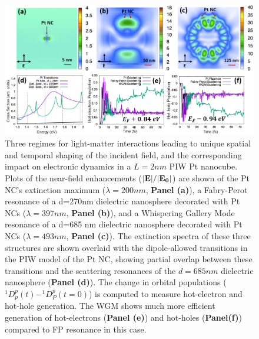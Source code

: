 \documentclass[journal=jpclcd,manuscript=article]{achemso}
\begin{document}
\begin{figure}
\begin{center}
\includegraphics[width=6in]{Pt_AllThree_Revision.png}
\caption{Three regimes for light-matter interactions leading to unique
spatial and temporal shaping of the incident field, and the corresponding
impact on electronic dynamics in a $L=2nm$ PIW Pt nanocube. Plots of the near-field enhancements (${\bf |E|}/{\bf |E_0|}$) are shown of the
Pt NC's extinction maximum ($\lambda=200 nm$, {\bf Panel (a)}), a Fabry-Perot resonance of a d=270nm dielectric nanosphere decorated with Pt NCs
($\lambda = 397 nm$, {\bf Panel (b)}),
and a Whispering Gallery Mode resonance of a d=685 nm dielectric nanosphere decorated with Pt NCs ($\lambda = 493 nm$, {\bf Panel (c)}).
The extinction spectra of these three structures are shown overlaid with the dipole-allowed transitions in the PIW model of the Pt NC, showing partial
overlap between these transitions and the scattering resonances of the $d=685 nm$ dielectric nanosphere ({\bf Panel (d)}).
The change in orbital populations ($^1D_p^p(t)-^1D_P^p(t=0)$) is computed to measure hot-electron and hot-hole generation.
The WGM shows much more efficient generation of hot-electrons ({\bf Panel (e)}) and hot-holes ({\bf Panel(f)}) compared to FP resonance in this case.}
\end{center}
\end{figure}
\end{document}
